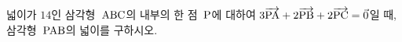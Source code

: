 넓이가 $14$인 삼각형~$\pt{ABC}$의 내부의 한 점~$\pt{P}$에 대하여 $3\vecAB{PA}+2\vecAB{PB}+2\vecAB{PC}=\vec{0}$일 때, 삼각형~$\pt{PAB}$의 넓이를 구하시오.

